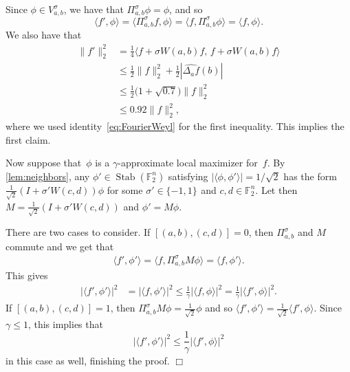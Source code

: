 \documentclass[11pt]{amsart}
\DeclareMathOperator{\Stab}{Stab}\DeclareMathOperator{\Spec}{Spec}
\newcommand{\F}{\mathbb{F}} %
\newcommand{\pmset}[1]{\{-1,1\}^{#1}} %
\theoremstyle{plain}
\theoremstyle{definition}
\theoremstyle{remark}
\renewenvironment{proof}[1][]{
    	\begin{trivlist}
     	\item[\hspace{\labelsep}{\em\noindent Proof#1:\/}]}
     	{{\hfill$\Box$}
    	\end{trivlist}
  }
\begin{document}
\begin{proof}
Since $\phi\in V_{a,b}^\sigma$, we have that $\Pi_{a,b}^\sigma\phi = \phi$, and so
\begin{equation*}
    \langle f',\phi\rangle = \langle \Pi_{a,b}^\sigma f,\phi\rangle = \langle f,\Pi_{a,b}^\sigma\phi\rangle = \langle f, \phi\rangle. 
\end{equation*}
We also have that
\begin{align*}
    \|f'\|_2^2
    &= \frac{1}{4} \big\langle f+\sigma W(a,b)f,\, f+\sigma W(a,b)f\big\rangle \\
    &\leq \frac{1}{2}\|f\|_2^2 + \frac{1}{2}|\widehat{\Delta_af}(b)| \\
    &\leq \frac{1}{2}\big(1 + \sqrt{0.7}\big) \|f\|_2^2 \\
    &\leq 0.92 \|f\|_2^2,
\end{align*}
where we used identity~\eqref{eq:FourierWeyl} for the first inequality.
This implies the first claim.

Now suppose that~$\phi$ is a $\gamma$-approximate local maximizer for~$f$.
By \cref{lem:neighbors}, any $\phi'\in\Stab(\F_2^n)$ satisfying $|\langle \phi,\phi'\rangle| = 1/\sqrt{2}$ has the form $\tfrac{1}{\sqrt{2}}(I + \sigma' W(c,d))\phi$ for some $\sigma' \in \pmset{}$ and $c,d\in \F_2^n$.
Let then $M = \tfrac{1}{\sqrt{2}}(I + \sigma' W(c,d))$ and $\phi' = M\phi$.

There are two cases to consider.
If $[(a,b),(c,d)] = 0$, then $\Pi_{a,b}^\sigma$ and $M$ commute and we get that
\begin{align*}
    \langle f',\phi'\rangle = \langle f, \Pi_{a,b}^\sigma M\phi\rangle
    =\langle f, \phi'\rangle.
\end{align*}
This gives
\begin{align*}
    |\langle f',\phi'\rangle|^2 &=|\langle f, \phi'\rangle|^2
    \leq \frac{1}{\gamma}|\langle f, \phi\rangle|^2
    = \frac{1}{\gamma}|\langle f',\phi\rangle|^2.
\end{align*}
If $[(a,b),(c,d)] = 1$, then $\Pi_{a,b}^\sigma M\phi = \frac{1}{\sqrt{2}}\phi$ and so $\langle f',\phi'\rangle = \frac{1}{\sqrt{2}}\langle f',\phi\rangle$.
Since~$\gamma\leq 1$, this implies that
\begin{equation*}
    |\langle f',\phi'\rangle|^2 \leq \frac{1}{\gamma}|\langle f',\phi\rangle|^2
\end{equation*}
in this case as well, finishing the proof.
\end{proof}
\end{document}
